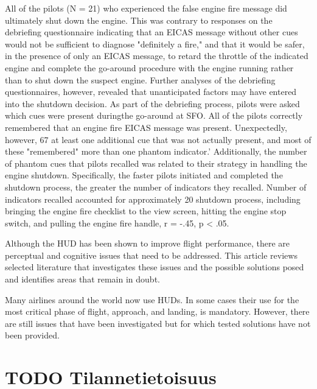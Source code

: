 \documentclass[utf8,bachelor,manualbib]{gradu3}
\begin{document}
All of the pilots (N = 21) who experienced the false engine fire message did
ultimately shut down the engine. This was contrary to responses on the debriefing
questionnaire indicating that an EICAS message without other cues would not be
sufficient to diagnose "definitely a fire," and that it would be safer, in the presence
of only an EICAS message, to retard the throttle of the indicated engine and
complete the go-around procedure with the engine running rather than to shut down
the suspect engine. Further analyses of the debriefing questionnaires, however,
revealed that unanticipated factors may have entered into the shutdown decision.
As part of the debriefing process, pilots were asked which cues were present duringthe go-around at SFO. All of the pilots correctly remembered that an engine fire
EICAS message was present. Unexpectedly, however, 67%
at least one additional cue that was not actually present, and most of these
"remembered" more than one phantom indicator.' Additionally, the number of
phantom cues that pilots recalled was related to their strategy in handling the engine
shutdown. Specifically, the faster pilots initiated and completed the shutdown
process, the greater the number of indicators they recalled. Number of indicators
recalled accounted for approximately 20%
shutdown process, including bringing the engine fire checklist to the view screen,
hitting the engine stop switch, and pulling the engine fire handle, r = -.45, p < .05. \citep{mosierym1998}

Although the HUD has been shown to improve flight
performance, there are perceptual and cognitive issues that need to be addressed. This
article reviews selected literature that investigates these issues and the possible solutions
posed and identifies areas that remain in doubt.

Many airlines around the world now use HUDs. In some cases
their use for the most critical phase of flight, approach, and landing, is mandatory.
However, there are still issues that have been investigated but for which
tested solutions have not been provided. 
\citep{crawford2006}






\section{TODO Tilannetietoisuus}
\end{document}
